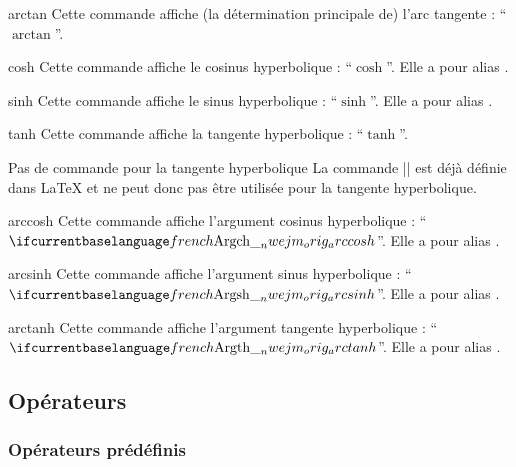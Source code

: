 \begin{docCommand}{arctan}{}
  Cette commande affiche (la détermination principale de) l'arc tangente :
  \enquote{$\arctan$}.
\end{docCommand}

\begin{docCommand}{cosh}{}
  Cette commande affiche le cosinus hyperbolique : \enquote{$\cosh$}. Elle a pour
  alias .
\end{docCommand}

\begin{docCommand}{sinh}{}
  Cette commande affiche le sinus hyperbolique : \enquote{$\sinh$}. Elle a pour
  alias .
\end{docCommand}

\begin{docCommand}{tanh}{}
  Cette commande affiche la tangente hyperbolique : \enquote{$\tanh$}.
  \begin{dbremark}{Pas de commande \protect{} pour la tangente hyperbolique}{}
    La commande |\th| est déjà définie dans \LaTeX{} et ne peut donc pas être
    utilisée pour la tangente hyperbolique.
  \end{dbremark}
\end{docCommand}

\begin{docCommand}{arccosh}{}
  Cette commande affiche l'argument cosinus hyperbolique :
  \enquote{$\arccosh$}. Elle a pour alias .
\end{docCommand}

\begin{docCommand}{arcsinh}{}
  Cette commande affiche l'argument sinus hyperbolique :
  \enquote{$\arcsinh$}. Elle a pour alias .
\end{docCommand}

\begin{docCommand}{arctanh}{}
  Cette commande affiche l'argument tangente hyperbolique :
  \enquote{$\arctanh$}. Elle a pour alias .
\end{docCommand}

\subsection{Opérateurs}

\subsubsection{Opérateurs prédéfinis}

